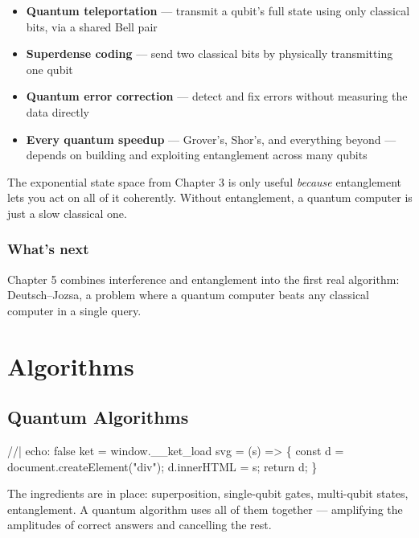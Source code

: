 \documentclass[
  11pt,
  letterpaper,
  oneside]{scrbook}
\newenvironment{Shaded}{\begin{snugshade}}{\end{snugshade}}
\newcommand{\NormalTok}[1]{\textcolor[rgb]{0.00,0.23,0.31}{#1}}
\providecommand{\tightlist}{%
  \setlength{\itemsep}{0pt}\setlength{\parskip}{0pt}}
\begin{document}
\begin{itemize}
\tightlist
\item
  \textbf{Quantum teleportation} --- transmit a qubit's full state using
  only classical bits, via a shared Bell pair
\item
  \textbf{Superdense coding} --- send two classical bits by physically
  transmitting one qubit
\item
  \textbf{Quantum error correction} --- detect and fix errors without
  measuring the data directly
\item
  \textbf{Every quantum speedup} --- Grover's, Shor's, and everything
  beyond --- depends on building and exploiting entanglement across many
  qubits
\end{itemize}

The exponential state space from Chapter 3 is only useful \emph{because}
entanglement lets you act on all of it coherently. Without entanglement,
a quantum computer is just a slow classical one.

\section{What's next}\label{whats-next-3}

Chapter 5 combines interference and entanglement into the first real
algorithm: Deutsch--Jozsa, a problem where a quantum computer beats any
classical computer in a single query.

\part{Algorithms}

\chapter{Quantum Algorithms}\label{sec-algorithms}

\begin{Shaded}
\begin{Highlighting}[]
\NormalTok{//| echo: false}
\NormalTok{ket = window.\_\_ket\_load}
\NormalTok{svg = (s) =\textgreater{} \{ const d = document.createElement("div"); d.innerHTML = s; return d; \}}
\end{Highlighting}
\end{Shaded}

The ingredients are in place: superposition, single-qubit gates,
multi-qubit states, entanglement. A quantum algorithm uses all of them
together --- amplifying the amplitudes of correct answers and cancelling
the rest.
\end{document}
